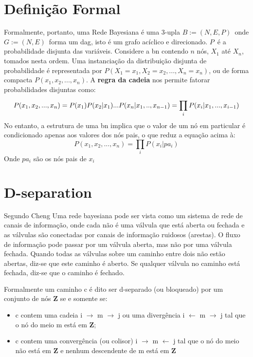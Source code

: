 \section{Definição Formal}
Formalmente, portanto, uma Rede Bayesiana é uma 3-upla $B := (N, E, P)$\ onde $G:=(N,E)$\ forma um \gls{dag}, isto é um grafo acíclico e direcionado. $P$\ é a probabilidade disjunta das variáveis.
Considere a \gls{bn} contendo $n$ nós, $X_1$ até $X_n$, tomados nesta ordem. Uma instanciação da distribuição disjunta de probabilidade é representada por $P(X_1 = x_1, X_2 = x_2, ... , X_n = x_n)$, ou de forma compacta $P(x_1, x_2, ..., x_n)$. A \textbf{regra da cadeia} nos permite fatorar probabilidades disjuntas como:
\begin{equation}
	P(x_1, x_2, ..., x_n) = P(x_1)P(x_2|x_1)...P(x_n|x_1,..,x_{n-1})\\
	= \prod_{i}^{}P(x_i|x_1,...,x_{i-1})
\end{equation}
No entanto, a estrutura de uma \gls{bn} implica que o valor de um nó em particular é condicionado apenas aos valores dos nós pais, o que reduz a equação acima à:
\begin{equation}\label{eq:pearl}
P(x_1, x_2, ..., x_n) = \prod_i P(x_i|pa_i)
\end{equation}
Onde $pa_i$ são os nós pais de $x_i$

\section{D-separation}
Segundo Cheng\cite{cheng02} Uma rede bayesiana pode ser vista como um sistema de rede de canais de informação, onde cada não é uma válvula que está aberta ou fechada e as válvulas são conectadas por canais de informação ruidosos (arestas). O fluxo de informação pode passar por um válvula aberta, mas não por uma válvula fechada. Quando todas as válvulas sobre um caminho entre dois não estão abertas, diz-se que este caminho é aberto. Se qualquer válvula no caminho está fechada, diz-se que o caminho é fechado.

Formalmente um caminho c é dito ser d-separado (ou bloqueado) por um conjunto de nós \textbf{Z} se e somente se:
\begin{itemize}
	\item c contem uma cadeia i $\rightarrow$ m $\rightarrow$ j ou uma divergência i $\leftarrow$ m $\rightarrow$ j tal que o nó do meio m está em \textbf{Z};
	\item c contem uma convergência (ou colisor) i $\rightarrow$ m $\leftarrow$ j tal que o nó do meio não está em $\textbf{Z}$ e nenhum descendente de m está em $\textbf{Z}$
\end{itemize}

